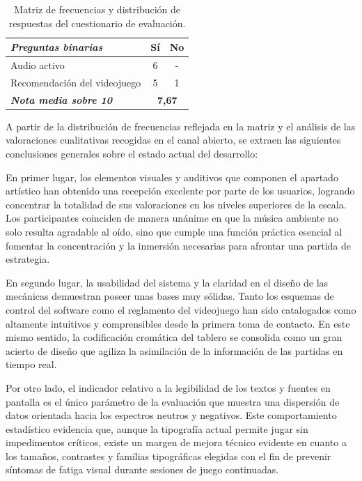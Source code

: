 \begin{table}[htbp]
\begin{tabular}{|l|c|c|c|c|c|}
		\textit{\textbf{Preguntas binarias}} & \multicolumn{2}{c|}{\textbf{Sí}} & \multicolumn{3}{c|}{\textbf{No}} \\ \hline
		Audio activo & \multicolumn{2}{c|}{6} & \multicolumn{3}{c|}{-} \\ \hline
		Recomendación del videojuego & \multicolumn{2}{c|}{5} & \multicolumn{3}{c|}{1} \\ \hline
		\multicolumn{1}{|l|}{\textit{\textbf{Nota media sobre 10}}} & \multicolumn{5}{|c|}{\textbf{7,67}}\\ \hline
	\end{tabular}
	\caption{Matriz de frecuencias y distribución de respuestas del cuestionario de evaluación.}
	\label{tab:resultados_encuesta_matriz}
\end{table}

A partir de la distribución de frecuencias reflejada en la matriz y el análisis de las valoraciones cualitativas recogidas en el canal abierto, se extraen las siguientes conclusiones generales sobre el estado actual del desarrollo:

En primer lugar, los elementos visuales y auditivos que componen el apartado artístico han obtenido una recepción excelente por parte de los usuarios, logrando concentrar la totalidad de sus valoraciones en los niveles superiores de la escala. Los participantes coinciden de manera unánime en que la música ambiente no solo resulta agradable al oído, sino que cumple una función práctica esencial al fomentar la concentración y la inmersión necesarias para afrontar una partida de estrategia.

En segundo lugar, la usabilidad del sistema y la claridad en el diseño de las mecánicas demuestran poseer unas bases muy sólidas. Tanto los esquemas de control del software como el reglamento del videojuego han sido catalogados como altamente intuitivos y comprensibles desde la primera toma de contacto. En este mismo sentido, la codificación cromática del tablero se consolida como un gran acierto de diseño que agiliza la asimilación de la información de las partidas en tiempo real.

\clearpage

Por otro lado, el indicador relativo a la legibilidad de los textos y fuentes en pantalla es el único parámetro de la evaluación que muestra una dispersión de datos orientada hacia los espectros neutros y negativos. Este comportamiento estadístico evidencia que, aunque la tipografía actual permite jugar sin impedimentos críticos, existe un margen de mejora técnico evidente en cuanto a los tamaños, contrastes y familias tipográficas elegidas con el fin de prevenir síntomas de fatiga visual durante sesiones de juego continuadas.

